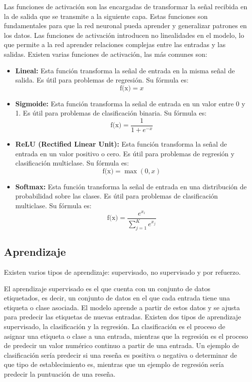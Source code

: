 Las funciones de activación son las encargadas de transformar la señal recibida en la de salida que se transmite a la siguiente capa.
Estas funciones son fundamentales para que la red neuronal pueda aprender y generalizar patrones en los datos.
Las funciones de activación introducen no linealidades en el modelo, lo que permite a la red aprender relaciones complejas entre las entradas y las salidas.
Existen varias funciones de activación\cite{funciones-activacion}, las más comunes son:
\begin{itemize}
	\item \textbf{Lineal:} Esta función transforma la señal de entrada en la misma señal de salida. Es útil para problemas de regresión. Su fórmula es: \begin{equation}
	\text{f(x)} = x
	\end{equation} 
	\item \textbf{Sigmoide:} Esta función transforma la señal de entrada en un valor entre 0 y 1. Es útil para problemas de clasificación binaria. Su fórmula es: \begin{equation}
	\text{f(x)} = \frac{1}{1 + e^{-x}}
	\end{equation}
	\item \textbf{ReLU (Rectified Linear Unit):} Esta función transforma la señal de entrada en un valor positivo o cero. Es útil para problemas de regresión y clasificación multiclase. Su fórmula es: \begin{equation}
	\text{f(x)} = \max(0, x)
	\end{equation}
	\item \textbf{Softmax:} Esta función transforma la señal de entrada en una distribución de probabilidad sobre las clases. Es útil para problemas de clasificación multiclase. Su fórmula es: \begin{equation}
	\text{f(x)} = \frac{e^{x_i}}{\sum_{j=1}^{K} e^{x_j}}
	\end{equation}
\end{itemize}

\subsection{Aprendizaje}

Existen varios tipos de aprendizaje: supervisado, no supervisado y por refuerzo.

El aprendizaje supervisado es el que cuenta con un conjunto de datos etiquetados, es decir, un conjunto de datos en el que cada entrada tiene una etiqueta o clase asociada.
El modelo aprende a partir de estos datos y se ajusta para predecir las etiquetas de nuevas entradas.
Existen dos tipos de aprendizaje supervisado, la clasificación y la regresión.
La clasificación es el proceso de asignar una etiqueta o clase a una entrada, mientras que la regresión es el proceso de predecir un valor numérico continuo a partir de una entrada.
Un ejemplo de clasificación sería predecir si una reseña es positiva o negativa o determinar de que tipo de establecimiento es, mientras que un ejemplo de regresión sería predecir la puntuación de una reseña.

